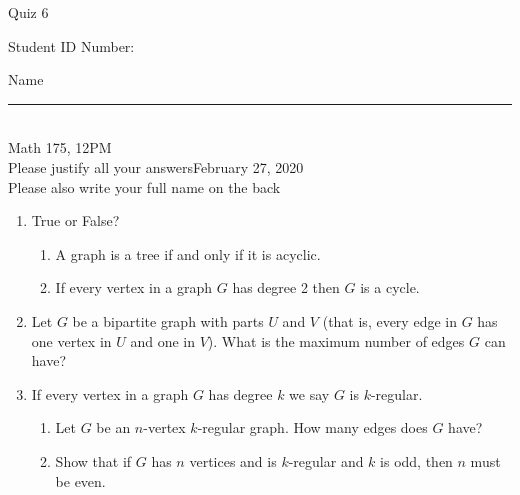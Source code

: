 \documentclass[12pt]{article}
\begin{document}
\begin{flushleft} 
\centerline{\LARGE{Quiz 6}} 
\vspace{5 mm}
{Student ID Number:}\hfill  
{Name \rule {2 in}{0.01in}}\\
Math 175, 12PM
\\
{Please justify all your answers}\hfill {February 27, 2020}
\\
{Please also write your full name on the back} 

\medskip
\end{flushleft}

\begin{enumerate}
	\item True or False?
	\begin{enumerate}
		\item A graph is a tree if and only if it is acyclic.
		\item If every vertex in a graph $G$ has degree 2 then $G$ is a cycle.
	\end{enumerate}
	\item Let $G$ be a bipartite graph with parts $U$ and $V$ (that is, every edge in $G$ has one vertex in $U$ and one in $V$). What is the maximum number of edges $G$ can have?
	\vfill
	\item If every vertex in a graph $G$ has degree $k$ we say $G$ is $k$-regular.
	\begin{enumerate}
		\item Let $G$ be an $n$-vertex $k$-regular graph. How many edges does $G$ have?
		\vfill
		\item Show that if $G$ has $n$ vertices and is $k$-regular and $k$ is odd, then $n$ must be even.
		\vfill
	\end{enumerate}
\end{enumerate}

\end{document}
